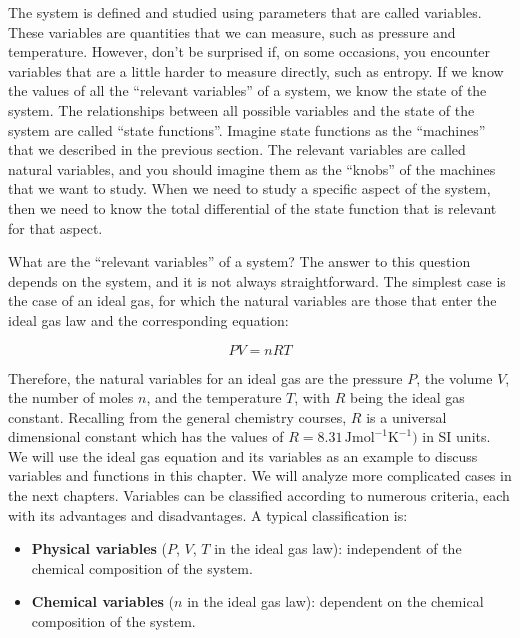 \documentclass[
  9pt,
]{extbook}
\providecommand{\tightlist}{%
  \setlength{\itemsep}{0pt}\setlength{\parskip}{0pt}}
\theoremstyle{definition}
\theoremstyle{definition}
\theoremstyle{definition}
\theoremstyle{remark}
\begin{document}
The system is defined and studied using parameters that are called variables. These variables are quantities that we can measure, such as pressure and temperature. However, don't be surprised if, on some occasions, you encounter variables that are a little harder to measure directly, such as entropy. If we know the values of all the ``relevant variables'' of a system, we know the state of the system. The relationships between all possible variables and the state of the system are called ``state functions''. Imagine state functions as the ``machines'' that we described in the previous section. The relevant variables are called natural variables, and you should imagine them as the ``knobs'' of the machines that we want to study. When we need to study a specific aspect of the system, then we need to know the total differential of the state function that is relevant for that aspect.

What are the ``relevant variables'' of a system? The answer to this question depends on the system, and it is not always straightforward. The simplest case is the case of an ideal gas, for which the natural variables are those that enter the ideal gas law and the corresponding equation:

\begin{equation}
  PV=nRT       
  \label{eq:idealgaslaworiginal}
\end{equation}

Therefore, the natural variables for an ideal gas are the pressure \(P\), the volume \(V\), the number of moles \(n\), and the temperature \(T\), with \(R\) being the ideal gas constant. Recalling from the general chemistry courses, \(R\) is a universal dimensional constant which has the values of \(R = 8.31 \,\text{J} \text{mol}^{-1} \text{K}^{-1})\) in SI units. We will use the ideal gas equation and its variables as an example to discuss variables and functions in this chapter. We will analyze more complicated cases in the next chapters. Variables can be classified according to numerous criteria, each with its advantages and disadvantages. A typical classification is:

\begin{itemize}
\tightlist
\item
  \textbf{Physical variables} (\(P\), \(V\), \(T\) in the ideal gas law): independent of the chemical composition of the system.
\item
  \textbf{Chemical variables} (\(n\) in the ideal gas law): dependent on the chemical composition of the system.
\end{itemize}
\end{document}
